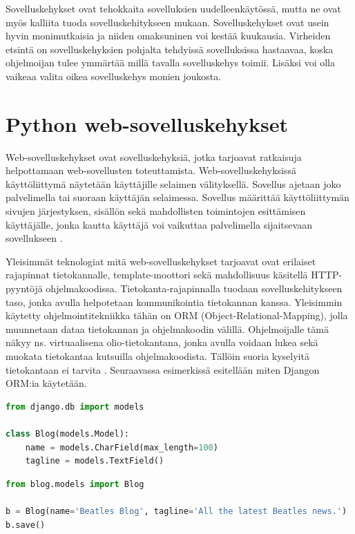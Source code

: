\documentclass[utf8]{gradu3}
\begin{document}
Sovelluskehykset ovat tehokkaita sovelluksien uudelleenkäytössä, mutta ne ovat myös kalliita tuoda sovelluskehitykseen mukaan. Sovelluskehykset ovat usein hyvin monimutkaisia ja niiden omaksuninen voi kestää kuukausia. Virheiden etsintä on sovelluskehyksien pohjalta tehdyissä sovelluksissa hastaavaa, koska ohjelmoijan tulee ymmärtää millä tavalla sovelluskehys toimii. Lisäksi voi olla vaikeaa valita oikea sovelluskehys monien joukosta. 

\chapter{Python web-sovelluskehykset}
Web-sovelluskehykset ovat sovelluskehyksiä, jotka tarjoavat ratkaisuja helpottamaan web-sovellusten toteuttamista. Web-sovelluskehyksissä käyttöliittymä näytetään käyttäjille selaimen välityksellä. Sovellus ajetaan joko palvelimella tai suoraan käyttäjän selaimessa. Sovellus määrittää käyttöliittymän sivujen järjestyksen, sisällön sekä mahdollisten toimintojen esittämisen käyttäjälle, jonka kautta käyttäjä voi vaikuttaa palvelimella sijaitsevaan sovellukseen \parencite{vosloo}. 

Yleisimmät teknologiat mitä web-sovelluskehykset tarjoavat ovat erilaiset rajapinnat tietokannalle, template-moottori sekä mahdollisuus käsitellä HTTP-pyyntöjä ohjelmakoodissa. Tietokanta-rajapinnalla tuodaan sovelluskehitykseen taso, jonka avulla helpotetaan kommunikointia tietokannan kanssa. Yleisimmin käytetty ohjelmointitekniikka tähän on ORM (Object-Relational-Mapping), jolla muunnetaan dataa tietokannan ja ohjelmakoodin välillä. Ohjelmoijalle tämä näkyy ns. virtuaalisena olio-tietokantana, jonka avulla voidaan lukea sekä muokata tietokantaa kutsuilla ohjelmakoodista. Tällöin suoria kyselyitä tietokantaan ei tarvita \parencite{Ghandeharizadeh}. Seuraavassa esimerkissä esitellään miten Djangon ORM:ia käytetään.

\begin{lstlisting}[language=Python]
from django.db import models

class Blog(models.Model):
    name = models.CharField(max_length=100)
    tagline = models.TextField()
\end{lstlisting}

\begin{lstlisting}[language=Python]
from blog.models import Blog

b = Blog(name='Beatles Blog', tagline='All the latest Beatles news.')
b.save()
\end{lstlisting}
\end{document}
